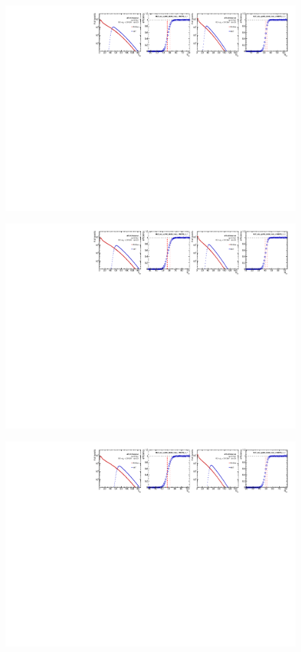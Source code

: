 \begin{figure}[H]
\centering
\includegraphics[width=1.\linewidth]{figs/sec_evtSlc/trigEff_pp13_run1/trigEff_Trig11.pdf}
\end{figure}
\begin{figure}[H]
\centering
\includegraphics[width=1.\linewidth]{figs/sec_evtSlc/trigEff_pp13_run1/trigEff_Trig12.pdf}
\end{figure}
\begin{figure}[H]
\centering
\includegraphics[width=1.\linewidth]{figs/sec_evtSlc/trigEff_pp13_run1/trigEff_Trig13.pdf}
\end{figure}
